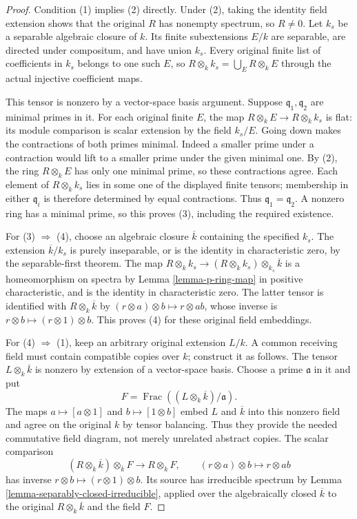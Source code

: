 \begin{proof}
Condition (1) implies (2) directly.
Under (2), taking the identity field
extension shows that the original
$R$ has nonempty spectrum, so $R\neq0$.
Let $k_s$ be a separable algebraic
closure of $k$. Its finite
subextensions $E/k$ are separable,
are directed under compositum,
and have union $k_s$.
Every original finite list of
coefficients in $k_s$ belongs to
one such $E$, so
$R\otimes_k k_s=\bigcup_E R\otimes_k E$
through the actual injective
coefficient maps.

This tensor is nonzero by a
vector-space basis argument.
Suppose $\mathfrak q_1,\mathfrak q_2$
are minimal primes in it.
For each original finite $E$,
the map $R\otimes_k E\to R\otimes_k k_s$
is flat: its module comparison
is scalar extension by the field
$k_s/E$. Going down makes the
contractions of both primes
minimal. Indeed a smaller prime
under a contraction would lift
to a smaller prime under the
given minimal one. By (2), the
ring $R\otimes_k E$ has only
one minimal prime, so these
contractions agree. Each element
of $R\otimes_k k_s$ lies in some
one of the displayed finite
tensors; membership in either
$\mathfrak q_i$ is therefore
determined by equal contractions.
Thus $\mathfrak q_1=\mathfrak q_2$.
A nonzero ring has a minimal
prime, so this proves (3),
including the required existence.

For (3) $\Rightarrow$ (4), choose
an algebraic closure $\overline k$
containing the specified $k_s$.
The extension $\overline k/k_s$
is purely inseparable, or is the
identity in characteristic zero,
by the separable-first theorem.
The map
$R\otimes_k k_s\to(R\otimes_k k_s)\otimes_{k_s}\overline k$
is a homeomorphism on spectra
by Lemma \ref{lemma-p-ring-map}
in positive characteristic, and
is the identity in characteristic
zero. The latter tensor is
identified with $R\otimes_k\overline k$
by
$(r\otimes a)\otimes b\mapsto r\otimes ab$,
whose inverse is
$r\otimes b\mapsto(r\otimes1)\otimes b$.
This proves (4) for these original
field embeddings.

For (4) $\Rightarrow$ (1), keep
an arbitrary original extension
$L/k$. A common receiving field
must contain compatible copies
over $k$; construct it as follows.
The tensor $L\otimes_k\overline k$
is nonzero by extension of a
vector-space basis. Choose a
prime $\mathfrak a$ in it and put
$$
F=\operatorname{Frac}((L\otimes_k\overline k)/\mathfrak a).
$$
The maps $a\mapsto[a\otimes1]$
and $b\mapsto[1\otimes b]$ embed
$L$ and $\overline k$ into this
nonzero field and agree on the
original $k$ by tensor balancing.
Thus they provide the needed
commutative field diagram, not
merely unrelated abstract copies.
The scalar comparison
$$
(R\otimes_k\overline k)\otimes_{\overline k}F
\longrightarrow R\otimes_k F,
\qquad(r\otimes a)\otimes b\longmapsto r\otimes ab
$$
has inverse $r\otimes b\mapsto(r\otimes1)\otimes b$.
Its source has irreducible
spectrum by Lemma
\ref{lemma-separably-closed-irreducible},
applied over the algebraically
closed $\overline k$ to the
original $R\otimes_k\overline k$
and the field $F$.


\end{proof}

